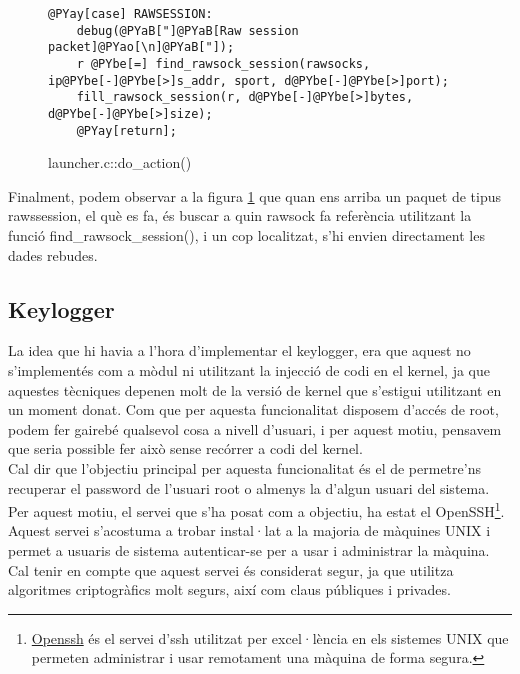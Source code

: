 \begin{figure}[htp]
\begin{Verbatim}[commandchars=@\[\]]
@PYay[case] RAWSESSION:
    debug(@PYaB["]@PYaB[Raw session packet]@PYao[\n]@PYaB["]);
    r @PYbe[=] find_rawsock_session(rawsocks, ip@PYbe[-]@PYbe[>]s_addr, sport, d@PYbe[-]@PYbe[>]port);
    fill_rawsock_session(r, d@PYbe[-]@PYbe[>]bytes, d@PYbe[-]@PYbe[>]size);
    @PYay[return];
\end{Verbatim}
    \caption{launcher.c::do\_action()}
    \label{fig:launcer_rawsession}
\end{figure}

Finalment, podem observar a la figura \ref{fig:launcer_rawsession} que quan ens arriba un paquet de 
tipus rawssession, el què es fa, és buscar a quin rawsock fa referència utilitzant la funció 
find\_rawsock\_session(), i un cop localitzat, s'hi envien directament les dades rebudes.


 
\subsection{Keylogger}
La idea que hi havia a l'hora d'implementar el keylogger, era que aquest no s'implementés com a mòdul ni
utilitzant la injecció de codi en el kernel, ja que aquestes tècniques depenen molt de la versió de kernel que 
s'estigui utilitzant en un moment donat. Com que per aquesta funcionalitat disposem d'accés de root, podem
fer gairebé qualsevol cosa a nivell d'usuari, i per aquest motiu, pensavem que seria possible fer això sense recórrer
a codi del kernel.\\

Cal dir que l'objectiu principal per aquesta funcionalitat és el de permetre'ns recuperar el password de l'usuari
root o almenys la d'algun usuari del sistema. Per aquest motiu, el servei que s'ha posat com a objectiu, ha estat el OpenSSH\footnote{\href{http://www.openssh.com/}{Openssh} és 
el servei d'ssh utilitzat per excel·lència en els sistemes UNIX que permeten administrar i usar remotament una màquina de 
forma segura.}.
Aquest servei s'acostuma a trobar instal·lat a la majoria de màquines UNIX i permet a usuaris de sistema
autenticar-se per a usar i administrar la màquina. Cal tenir en compte que aquest servei és considerat segur,
ja que utilitza algoritmes criptogràfics molt segurs, així com claus públiques i privades.\\

